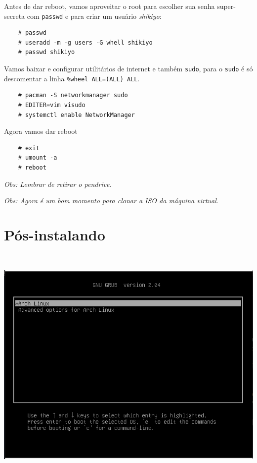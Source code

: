 \documentclass{article}
\newcommand{\obs}[1]{\textit{ Obs:#1 }}
\begin{document}
Antes de dar reboot,
vamos aproveitar o root para escolher
sua senha super-secreta com \texttt{passwd}
e para criar um usuário \emph{shikiyo}:

\begin{verbatim}
    # passwd
    # useradd -m -g users -G whell shikiyo
    # passwd shikiyo
\end{verbatim}

Vamos baixar e configurar utilitários de internet
e também \texttt{sudo},
para o \texttt{sudo} é só
descomentar a linha \texttt{\%wheel ALL=(ALL) ALL}.

\begin{verbatim}
    # pacman -S networkmanager sudo
    # EDITER=vim visudo
    # systemctl enable NetworkManager
\end{verbatim}

Agora vamos dar reboot

\begin{verbatim}
    # exit
    # umount -a
    # reboot
\end{verbatim}

\obs{
Lembrar de retirar o pendrive.
}

\obs{
Agora é um bom momento para clonar a ISO da máquina virtual.
}

\section{Pós-instalando}\

\begin{center}
    \includegraphics[width=\textwidth]{Imgs/Grub.png}
\end{center}
\end{document}
